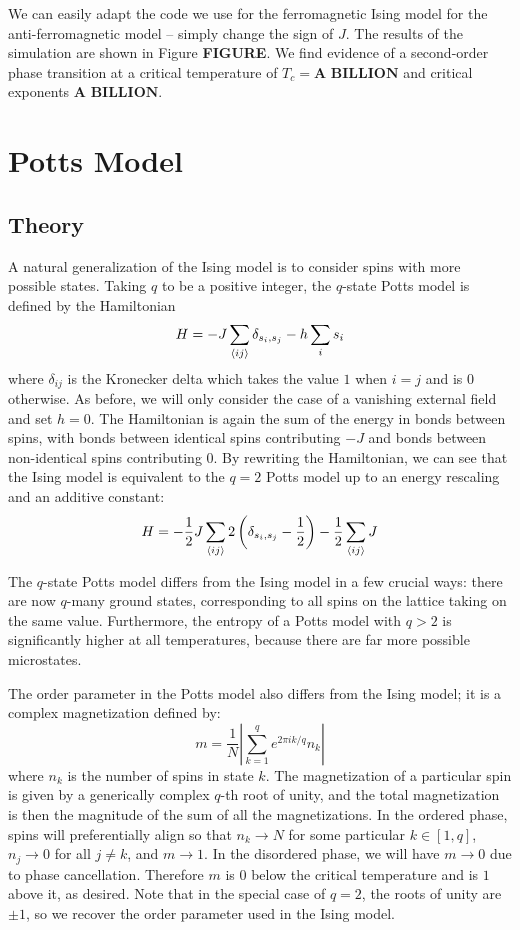 \documentclass[twocolumn,aps,prl]{revtex4-1} %
\begin{document}
We can easily adapt the code we use for the ferromagnetic Ising model for the anti-ferromagnetic model -- simply change the sign of $J$. The results of the simulation are shown in Figure \textbf{FIGURE}. We find evidence of a second-order phase transition at a critical temperature of $T_c = \textbf{A BILLION}$ and critical exponents $\textbf{A BILLION}$. 






\section{Potts Model}
\subsection{Theory}
A natural generalization of the Ising model is to consider spins with more possible states. Taking $q$ to be a positive integer, the $q$-state Potts model is defined by the Hamiltonian
\begin{equation}
	H = -J\sum_{\braket{ij}}\delta_{s_i,s_j} - h\sum_{i}s_i
\end{equation}
where $\delta_{ij}$ is the Kronecker delta which takes the value $1$ when $i = j$ and is 0 otherwise. As before, we will only consider the case of a vanishing external field and set $h = 0$. The Hamiltonian is again the sum of the energy in bonds between spins, with bonds between identical spins contributing $-J$ and bonds between non-identical spins contributing 0. By rewriting the Hamiltonian, we can see that the Ising model is equivalent to the $q = 2$ Potts model up to an energy rescaling and an additive constant:
\begin{equation}
	H = -\frac{1}{2}J\sum_{\braket{ij}}2\left(\delta_{s_i,s_j} - \frac{1}{2}\right) - \frac{1}{2}\sum_{\braket{ij}}J
\end{equation}

The $q$-state Potts model differs from the Ising model in a few crucial ways: there are now $q$-many ground states, corresponding to all spins on the lattice taking on the same value. Furthermore, the entropy of a Potts model with $q > 2$ is significantly higher at all temperatures, because there are far more possible microstates.

The order parameter in the Potts model also differs from the Ising model; it is a complex magnetization defined by:
\begin{equation}
	m = \frac{1}{N}\left|\sum_{k=1}^qe^{2\pi i k/q}n_k\right|
\end{equation}
where $n_k$ is the number of spins in state $k$. The magnetization of a particular spin is given by a generically complex $q$-th root of unity, and the total magnetization is then the magnitude of the sum of all the magnetizations. In the ordered phase, spins will preferentially align so that $n_k \to N$ for some particular $k \in [1,q]$, $n_j \to 0$ for all $j \neq k$, and $m \to 1$. In the disordered phase, we will have $m \to 0$ due to phase cancellation. Therefore $m$ is 0 below the critical temperature and is $1$ above it, as desired. Note that in the special case of $q = 2$, the roots of unity are $\pm 1$, so we recover the order parameter used in the Ising model.
\end{document}
